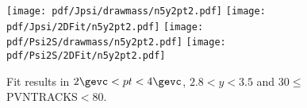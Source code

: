 \begin{figure}[H]
\begin{center}
\texttt{[image: pdf/Jpsi/drawmass/n5y2pt2.pdf]}
\texttt{[image: pdf/Jpsi/2DFit/n5y2pt2.pdf]}
\vspace*{-0.5cm}
\texttt{[image: pdf/Psi2S/drawmass/n5y2pt2.pdf]}
\texttt{[image: pdf/Psi2S/2DFit/n5y2pt2.pdf]}
\vspace*{-0.5cm}
\end{center}
\caption{Fit results in $2\gevc<pt<4\gevc$, $2.8<y<3.5$ and 30$\leq$PVNTRACKS$<$80.}
\label{Fitn5y2pt2}
\end{figure}
